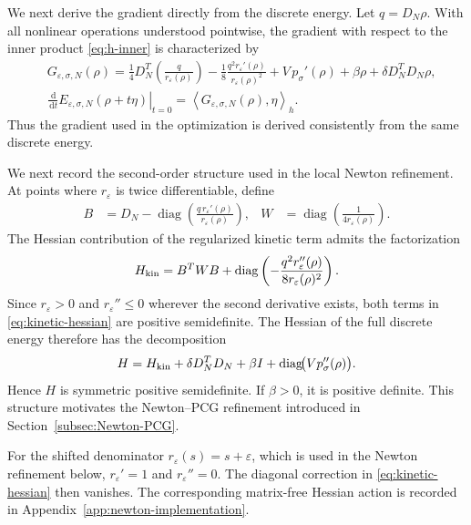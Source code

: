 \documentclass[11pt]{article}
\newcommand{\dd}{\,\mathrm{d}}
\newcommand{\eps}{\varepsilon}
\newcommand{\sig}{\sigma}
\newcommand{\inner}[2]{\left\langle #1,#2\right\rangle}
\theoremstyle{plain}
\theoremstyle{definition}
\numberwithin{equation}{section}
\begin{document}
We next derive the gradient directly from the discrete energy.
Let $q=D_N\rho$. With all nonlinear operations understood
pointwise, the gradient with respect to the inner product
\eqref{eq:h-inner} is characterized by
\begin{equation}
\label{eq:discrete-gradient}
\begin{aligned}
&G_{\eps,\sig,N}(\rho)
=
\frac14D_N^T
\left(
\frac{q}{r_\eps(\rho)}
\right)
-\frac18
\frac{q^2r_\eps'(\rho)}
     {r_\eps(\rho)^2}
+V\,p_\sig'(\rho)
+\beta\rho
+\delta D_N^TD_N\rho,\\
&\left.
\frac{\dd}{\dd t}
E_{\eps,\sig,N}(\rho+t\eta)
\right|_{t=0}
=
\inner{G_{\eps,\sig,N}(\rho)}{\eta}_h .
\end{aligned}
\end{equation}
Thus the gradient used in the optimization is derived consistently
from the same discrete energy.

We next record the second-order structure used in the local Newton
refinement. At points where $r_\eps$ is twice differentiable, define
\begin{equation}
\label{eq:kinetic-hessian-factorization}
\begin{aligned}
B
&=
D_N-
\operatorname{diag}
\left(
\frac{q\,r_\eps'(\rho)}
     {r_\eps(\rho)}
\right),
&
W
&=
\operatorname{diag}
\left(
\frac{1}{4r_\eps(\rho)}
\right).
\end{aligned}
\end{equation}
The Hessian contribution of the regularized kinetic term admits the
factorization
\begin{equation}
\label{eq:kinetic-hessian}
H_{\rm kin}
=
B^TWB
+
\operatorname{diag}
\left(
-\frac{q^2r_\eps''(\rho)}
       {8r_\eps(\rho)^2}
\right).
\end{equation}
Since $r_\eps>0$ and $r_\eps''\le0$ wherever the second derivative
exists, both terms in \eqref{eq:kinetic-hessian} are positive
semidefinite. The Hessian of the full discrete energy therefore has
the decomposition
\begin{equation}
\label{eq:full-hessian-spd-form}
H
=
H_{\rm kin}
+\delta D_N^TD_N
+\beta I
+\operatorname{diag}\!\bigl(Vp_\sig''(\rho)\bigr).
\end{equation}
Hence $H$ is symmetric positive semidefinite. If $\beta>0$, it is
positive definite. This structure motivates the Newton--PCG
refinement introduced in Section~\ref{subsec:Newton-PCG}.

For the shifted denominator $r_\eps(s)=s+\eps$, which is used in the
Newton refinement below, $r_\eps'=1$ and $r_\eps''=0$. The diagonal
correction in \eqref{eq:kinetic-hessian} then vanishes. The
corresponding matrix-free Hessian action is recorded in
Appendix~\ref{app:newton-implementation}.
\end{document}
